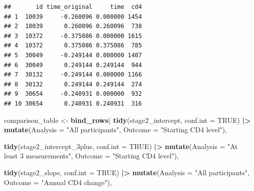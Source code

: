 \documentclass[
]{article}
\newenvironment{Shaded}{\begin{snugshade}}{\end{snugshade}}
\newcommand{\AttributeTok}[1]{\textcolor[rgb]{0.13,0.29,0.53}{#1}}
\newcommand{\ConstantTok}[1]{\textcolor[rgb]{0.56,0.35,0.01}{#1}}
\newcommand{\FunctionTok}[1]{\textcolor[rgb]{0.13,0.29,0.53}{\textbf{#1}}}
\newcommand{\NormalTok}[1]{#1}
\newcommand{\OtherTok}[1]{\textcolor[rgb]{0.56,0.35,0.01}{#1}}
\newcommand{\SpecialCharTok}[1]{\textcolor[rgb]{0.81,0.36,0.00}{\textbf{#1}}}
\newcommand{\StringTok}[1]{\textcolor[rgb]{0.31,0.60,0.02}{#1}}
\begin{document}
\begin{verbatim}
##       id time_original     time  cd4
## 1  10039     -0.260096 0.000000 1454
## 2  10039      0.260096 0.260096  738
## 3  10372     -0.375086 0.000000 1615
## 4  10372      0.375086 0.375086  785
## 5  30049     -0.249144 0.000000 1407
## 6  30049      0.249144 0.249144  944
## 7  30132     -0.249144 0.000000 1166
## 8  30132      0.249144 0.249144  274
## 9  30654     -0.240931 0.000000  932
## 10 30654      0.240931 0.240931  316
\end{verbatim}

\begin{Shaded}
\begin{Highlighting}[]
\NormalTok{comparison\_table }\OtherTok{\textless{}{-}} \FunctionTok{bind\_rows}\NormalTok{(}
  \FunctionTok{tidy}\NormalTok{(stage2\_intercept, }\AttributeTok{conf.int =} \ConstantTok{TRUE}\NormalTok{) }\SpecialCharTok{|\textgreater{}}
    \FunctionTok{mutate}\NormalTok{(}\AttributeTok{Analysis =} \StringTok{"All participants"}\NormalTok{,}
           \AttributeTok{Outcome =} \StringTok{"Starting CD4 level"}\NormalTok{),}

  \FunctionTok{tidy}\NormalTok{(stage2\_intercept\_3plus, }\AttributeTok{conf.int =} \ConstantTok{TRUE}\NormalTok{) }\SpecialCharTok{|\textgreater{}}
    \FunctionTok{mutate}\NormalTok{(}\AttributeTok{Analysis =} \StringTok{"At least 3 measurements"}\NormalTok{,}
           \AttributeTok{Outcome =} \StringTok{"Starting CD4 level"}\NormalTok{),}

  \FunctionTok{tidy}\NormalTok{(stage2\_slope, }\AttributeTok{conf.int =} \ConstantTok{TRUE}\NormalTok{) }\SpecialCharTok{|\textgreater{}}
    \FunctionTok{mutate}\NormalTok{(}\AttributeTok{Analysis =} \StringTok{"All participants"}\NormalTok{,}
           \AttributeTok{Outcome =} \StringTok{"Annual CD4 change"}\NormalTok{),}


\end{Highlighting}
\end{Shaded}
\end{document}
